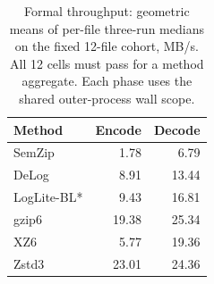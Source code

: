 \begin{table}[t]\centering\small
\caption{Formal throughput: geometric means of per-file three-run medians on the fixed 12-file cohort, MB/s. All 12 cells must pass for a method aggregate. Each phase uses the shared outer-process wall scope.}
\label{tab:external-speed}
\begin{tabular}{lrr}
\toprule
Method & Encode & Decode \\
\midrule
SemZip & 1.78 & 6.79 \\
DeLog & 8.91 & 13.44 \\
LogLite-BL* & 9.43 & 16.81 \\
gzip6 & 19.38 & 25.34 \\
XZ6 & 5.77 & 19.36 \\
Zstd3 & 23.01 & 24.36 \\
\bottomrule
\end{tabular}\end{table}
